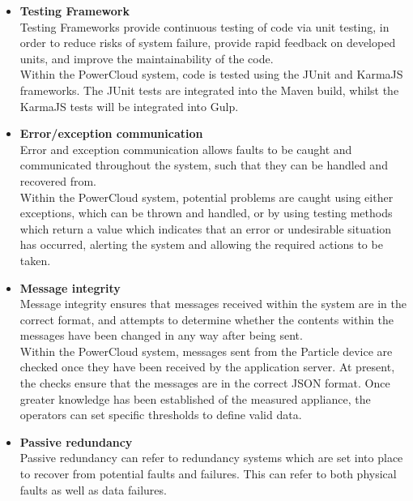 \documentclass{article}
\begin{document}
	\begin{itemize}
		\item \textbf{Testing Framework}\\
		Testing Frameworks provide continuous testing of code via unit testing, 
		in order to reduce risks of system failure, provide rapid feedback on 
		developed units, and improve the maintainability of the code.\\
		
		Within the PowerCloud system, code is tested using the JUnit and 
		KarmaJS frameworks. The JUnit tests are integrated into the Maven 
		build, whilst the KarmaJS tests will be integrated into Gulp.
		
		\item \textbf{Error/exception communication}\\
		Error and exception communication allows faults to be caught and 
		communicated throughout the system, such that they can be handled and 
		recovered from.\\
		
		Within the PowerCloud system, potential problems are caught using 
		either exceptions, which can be thrown and handled, or by using testing 
		methods which return a value which indicates that an error or 
		undesirable situation has occurred, alerting the system and allowing 
		the required actions to be taken.
		
		\item \textbf{Message integrity}\\
		Message integrity ensures that messages received within the system are 
		in the correct format, and attempts to determine whether the contents 
		within the messages have been changed in any way after being sent.\\
		
		Within the PowerCloud system, messages sent from the Particle device 
		are checked once they have been received by the application server. At 
		present, the checks ensure that the messages are in the correct JSON 
		format. Once greater knowledge has been established of the measured 
		appliance, the operators can set specific thresholds to define valid 
		data.
		
		\item \textbf{Passive redundancy}\\
		Passive redundancy can refer to redundancy systems which are set into 
		place to recover from potential faults and failures. This can refer to 
		both physical faults as well as data failures.\\
		

\end{itemize}
\end{document}
